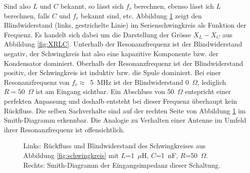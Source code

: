 \documentclass[twoside,a4paper,11pt,halfparskip,DIV=11,notitlepage]{scrartcl}
\newcommand{\uline}[1]{%
    \tikz[baseline=(todotted.base)]{
        \node[inner sep=1pt,outer sep=0pt] (todotted) {#1};
        \draw[color=HB9UFblue,thick] (todotted.south west) -- (todotted.south east);
    }%
}%
\newcommand{\udash}[1]{%
    \tikz[baseline=(todotted.base)]{
        \node[inner sep=1pt,outer sep=0pt] (todotted) {#1};
        \draw[dashed,color=HB9UFred,thick] (todotted.south west) -- (todotted.south east);
    }%
}%
\begin{document}
Sind also $L$ und $C$ bekannt, so lässt sich $f_r$ berechnen, ebenso lässt ich
$L$ berechnen, falls $C$ und $f_r$ bekannt sind, etc. Abbildung \ref{fig:resonanzplot}
zeigt den Blindwiderstand (links, gestrichelte Linie) im Serienschwingkreis als Funktion der Frequenz. Es
handelt sich dabei um die Darstellung der Grösse $X_L-X_C$ aus Abbildung \ref{fig:XRLC}.
Unterhalb der Resonanzfrequenz ist der Blindwiderstand negativ, der
Schwingkreis hat also eine kapazitive Komponente bzw. der Kondensator
dominiert. Oberhalb der Resonanzfrequenz ist der Blindwiderstand positiv, der
Schwingkreis ist induktiv bzw. die Spule dominiert. Bei einer Resonanzfrequenz
von $f_r\approx$~5~MHz ist der Blindwiderstand 0~$\Omega$, lediglich $R=50$~$\Omega$
ist am Eingang sichtbar. Ein Abschluss von 50~$\Omega$ entspricht einer perfekten
Anpassung und deshalb entsteht bei dieser Frequenz überhaupt kein Rückfluss.
Die selben Sachverhalte sind auf der rechten Seite von Abbildung
\ref{fig:resonanzplot} im Smith-Diagramm erkennbar. Die Analogie zu Verhalten
einer Antenne im Umfeld ihrer Resonanzfrequenz ist offensichtlich.
\begin{figure}
\begin{center}
\hfill
{}\end{center}
\caption{Links: Rückfluss und Blindwiderstand des Schwingkreises aus Abbildung \ref{fig:schwingkreis} mit 
$L$=1~$\mu$H, $C$=1~nF, $R$=50~$\Omega$. Rechts: Smith-Diagramm der Eingangsimpedanz dieser Schaltung.}
\label{fig:resonanzplot}
\end{figure}
\end{document}
